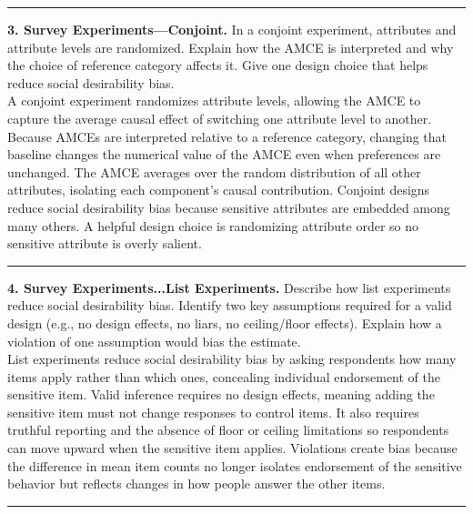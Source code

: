 \documentclass[12pt]{article}
\newcommand{\pts}[1]{\todo[color=blue!20,size=\tiny]{#1 pts}}
\begin{document}
\vspace{0.5cm}\hrule\vspace{0.4cm}

\textbf{3. Survey Experiments---Conjoint.} In a conjoint experiment, attributes and attribute levels are randomized. Explain how the AMCE is interpreted and why the choice of reference category affects it. Give one design choice that helps reduce social desirability bias.\\[0.2cm]
\pts{2} A conjoint experiment randomizes attribute levels, allowing the AMCE to capture the average causal effect of switching one attribute level to another. \pts{2} Because AMCEs are interpreted relative to a reference category, changing that baseline changes the numerical value of the AMCE even when preferences are unchanged. \pts{2} The AMCE averages over the random distribution of all other attributes, isolating each component’s causal contribution. \pts{2} Conjoint designs reduce social desirability bias because sensitive attributes are embedded among many others. \pts{2} A helpful design choice is randomizing attribute order so no sensitive attribute is overly salient.

\vspace{0.5cm}\hrule\vspace{0.4cm}

\textbf{4. Survey Experiments...List Experiments.} Describe how list experiments reduce social desirability bias. Identify two key assumptions required for a valid design (e.g., no design effects, no liars, no ceiling/floor effects). Explain how a violation of one assumption would bias the estimate.\\[0.2cm]

\pts{2} List experiments reduce social desirability bias by asking respondents how many items apply rather than which ones, concealing individual endorsement of the sensitive item. \pts{2} Valid inference requires no design effects, meaning adding the sensitive item must not change responses to control items. \pts{2} It also requires truthful reporting and the absence of floor or ceiling limitations so respondents can move upward when the sensitive item applies. \pts{2} Violations create bias because the difference in mean item counts no longer isolates endorsement of the sensitive behavior but reflects changes in how people answer the other items.

\vspace{0.5cm}\hrule\vspace{0.4cm}
\end{document}
